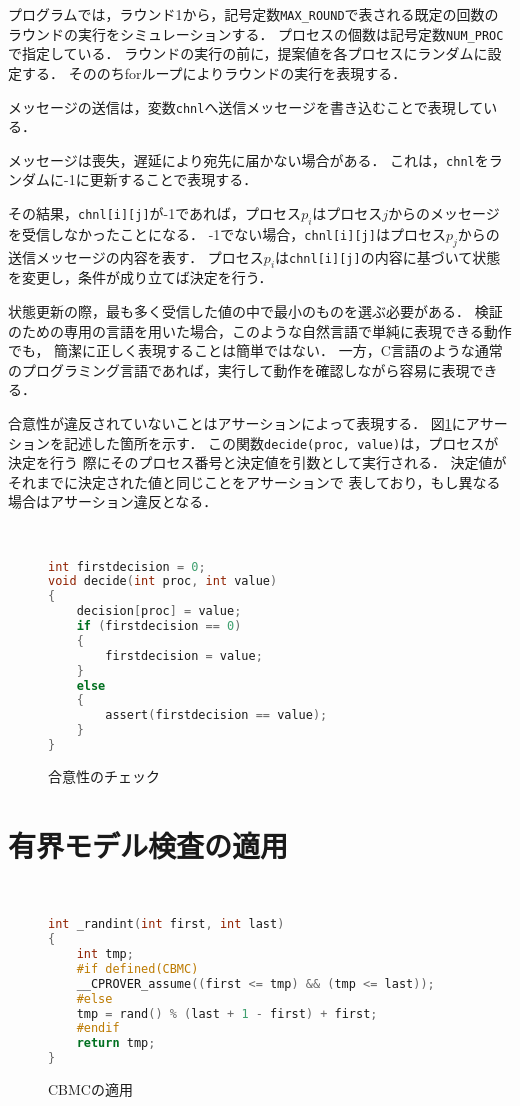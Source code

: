 \documentclass[technicalreport]{ieicej}
\theoremstyle{plain}
\begin{document}
プログラムでは，ラウンド1から，記号定数\verb|MAX_ROUND|で表される既定の回数のラウンドの実行をシミュレーションする．
プロセスの個数は記号定数\verb|NUM_PROC|で指定している．
ラウンドの実行の前に，提案値を各プロセスにランダムに設定する．
そののちforループによりラウンドの実行を表現する．

メッセージの送信は，変数\verb|chnl|へ送信メッセージを書き込むことで表現している．

メッセージは喪失，遅延により宛先に届かない場合がある．
これは，\verb|chnl|をランダムに-1に更新することで表現する．

その結果，\verb|chnl[i][j]|が-1であれば，プロセス$p_i$はプロセス$j$からのメッセージを受信しなかったことになる．
-1でない場合，\verb|chnl[i][j]|はプロセス$p_j$からの送信メッセージの内容を表す．
プロセス$p_i$は\verb|chnl[i][j]|の内容に基づいて状態を変更し，条件が成り立てば決定を行う．

状態更新の際，最も多く受信した値の中で最小のものを選ぶ必要がある．
検証のための専用の言語を用いた場合，このような自然言語で単純に表現できる動作でも，
簡潔に正しく表現することは簡単ではない．
一方，C言語のような通常のプログラミング言語であれば，実行して動作を確認しながら容易に表現できる．

合意性が違反されていないことはアサーションによって表現する．
図\ref{fig:assert}にアサーションを記述した箇所を示す．
この関数\verb|decide(proc, value)|は，プロセスが決定を行う
際にそのプロセス番号と決定値を引数として実行される．
決定値がそれまでに決定された値と同じことをアサーションで
表しており，もし異なる場合はアサーション違反となる．

\begin{figure}[t]
\centering　{\scriptsize
	\begin{lstlisting}[language=c]
int firstdecision = 0;
void decide(int proc, int value) 
{
	decision[proc] = value;
	if (firstdecision == 0)
	{
		firstdecision = value;
	}
	else
	{
		assert(firstdecision == value);
	}
}
\end{lstlisting}}
\caption{合意性のチェック}\label{fig:assert}
\end{figure}          


\section{有界モデル検査の適用}\label{sec:cmbc}
\begin{figure}[t]
    \centering　{\scriptsize
\begin{lstlisting}[language=c]
int _randint(int first, int last)
{
    int tmp;
    #if defined(CBMC)
    __CPROVER_assume((first <= tmp) && (tmp <= last));
    #else
    tmp = rand() % (last + 1 - first) + first;
    #endif
    return tmp;
}
\end{lstlisting}}

        \caption{CBMCの適用}\label{fig:cbmc}
    \end{figure}          
   
\end{document}
